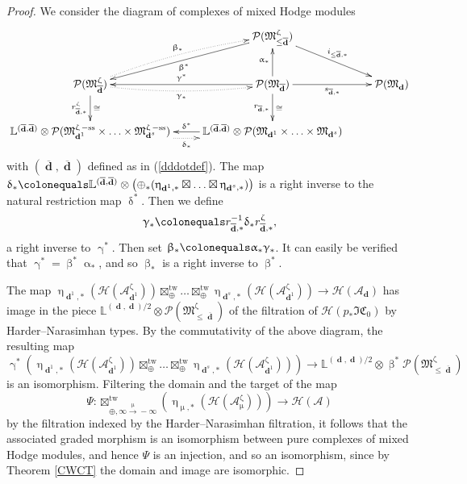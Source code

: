\documentclass[a4paper,10pt]{amsart}
\renewcommand{\alpha}{\upalpha}
\renewcommand{\beta}{\upbeta}
\renewcommand{\gamma}{\upgamma}
\renewcommand{\delta}{\updelta}
\renewcommand{\zeta}{\upzeta}
\renewcommand{\mu}{\upmu}
\renewcommand{\eta}{\upeta}
\newcommand{\IS}{\mathcal{P}}
\newcommand{\LL}{\mathbb{L}}
\newcommand{\Mst}{\mathfrak{M}}
\newcommand{\ICSt}{\mathfrak{IC}}
\DeclareMathOperator{\sst}{-ss}
\DeclareMathOperator{\tw}{tw}
\DeclareMathOperator{\dd}{\mathbf{d}}
\begin{document}
\begin{proof}
We consider the diagram of complexes of mixed Hodge modules
\[
\xymatrix{
&\IS(\Mst_{\leq \overline{\dd}}^{\zeta})\ar[dl]^{\beta^*}\ar[dr]^{i_{\leq\overline{\dd},*}}\\
\IS(\Mst_{\overline{\dd}}^{\zeta})\ar@/^/@{.>}[ur]^{\beta_*} \ar[d]_{r^{\zeta}_{\overline{\dd},*}}^{\cong} \ar@/_/@{.>}[r]_{\gamma_*}&\ar[u]^{\alpha_*} \ar[l]_{\gamma^*}\IS(\Mst_{\overline{\dd}})\ar[r]_{s_{\overline{\dd},*}}\ar[d]_{r_{\overline{\dd},*}}^{\cong} & \IS(\Mst_{\dd})\\
\LL^{(\overline{\dd},\overline{\dd})}\otimes\IS(\Mst_{\dd^1}^{\zeta\sst}\times\ldots\times\Mst_{\dd^s}^{\zeta\sst}) \ar@/_/@{.>}[r]_-{\delta_*}& \LL^{(\overline{\dd},\overline{\dd})}\otimes\IS(\Mst_{\dd^1}\times\ldots\times\Mst_{\dd^s})\ar[l]_-{\delta^*}
}
\]
with $(\overline{\dd},\overline{\dd})$ defined as in (\ref{dddotdef}).  The map $\delta_*\colonequals \LL^{(\overline{\dd},\overline{\dd})}\otimes\left(\oplus_*(\eta_{\dd^1,*}\boxtimes\ldots\boxtimes\eta_{\dd^s,*})\right)$ is a right inverse to the natural restriction map $\delta^*$.  Then we define
\[
\gamma_*\colonequals r_{\overline{\dd},*}^{-1}\delta_*r^{\zeta}_{\overline{\dd},*},
\]
a right inverse to $\gamma^*$.  Then set $\beta_*\colonequals \alpha_*\gamma_*$.  It can easily be verified that $\gamma^*=\beta^*\alpha_*$, and so $\beta_*$ is a right inverse to $\beta^*$.

The map $\eta_{\dd^1,*}(\mathcal{H}(\mathcal{A}_{\dd^1}^{\zeta}))\boxtimes_{\oplus}^{\tw}\ldots \boxtimes_{\oplus}^{\tw}\eta_{\dd^s,*}(\mathcal{H}(\mathcal{A}_{\dd^1}^{\zeta}))\rightarrow \mathcal{H}(\mathcal{A}_{\dd})$ has image in the piece $\LL^{(\dd,\dd)/2}\otimes \IS(\Mst^{\zeta}_{\leq\overline{\dd}})$ of the filtration of $\mathcal{H}(p_*\ICSt_0)$ by Harder--Narasimhan types.  By the commutativity of the above diagram, the resulting map
\[
\gamma^*\left(\eta_{\dd^1,*}(\mathcal{H}(\mathcal{A}_{\dd^1}^{\zeta}))\boxtimes_{\oplus}^{\tw}\ldots \boxtimes_{\oplus}^{\tw}\eta_{\dd^s,*}(\mathcal{H}(\mathcal{A}_{\dd^1}^{\zeta}))\right)\rightarrow  \LL^{(\dd,\dd)/2}\otimes\beta^*\IS(\Mst^{\zeta}_{\leq\overline{\dd}})
\]
is an isomorphism.  Filtering the domain and the target of the map
\[
\Psi\colon \boxtimes_{\oplus,\infty \xrightarrow{\mu}-\infty}^{\tw}\left(\eta_{\mu,*}(\mathcal{H}(\mathcal{A}_{\mu}^{\zeta}))\right)\rightarrow \mathcal{H}(\mathcal{A})
\]
by the filtration indexed by the Harder--Narasimhan filtration, it follows that the associated graded morphism is an isomorphism between pure complexes of mixed Hodge modules, and hence $\Psi$ is an injection, and so an isomorphism, since by Theorem \ref{CWCT} the domain and image are isomorphic. 


\end{proof}
\end{document}
